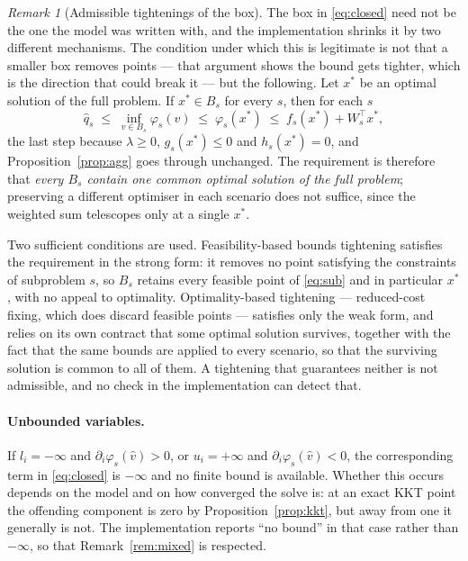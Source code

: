 \documentclass[11pt]{article}
\theoremstyle{plain}
\theoremstyle{remark}
\newtheorem{remark}[lemma]{Remark}
\newcommand{\W}{W}
\newcommand{\vhat}{\hat{v}}
\newcommand{\qhat}{\hat{q}}
\begin{document}
\begin{remark}[Admissible tightenings of the box]\label{rem:boxtighten}
The box in \eqref{eq:closed} need not be the one the model was written with, and
the implementation shrinks it by two different mechanisms.  The condition under
which this is legitimate is not that a smaller box removes points --- that
argument shows the bound gets tighter, which is the direction that could break
it --- but the following.  Let $x^{*}$ be an optimal solution of the full
problem.  If $x^{*} \in B_s$ for every $s$, then for each $s$
\[
  \qhat_s \;\le\; \inf_{v \in B_s} \varphi_s(v) \;\le\; \varphi_s(x^{*})
          \;\le\; f_s(x^{*}) + \W_s^{\top} x^{*},
\]
the last step because $\lambda \ge 0$, $g_s(x^{*}) \le 0$ and $h_s(x^{*}) = 0$,
and Proposition~\ref{prop:agg} goes through unchanged.  The requirement is
therefore that \emph{every $B_s$ contain one common optimal solution of the full
problem}; preserving a different optimiser in each scenario does not suffice,
since the weighted sum telescopes only at a single $x^{*}$.

Two sufficient conditions are used.  Feasibility-based bounds tightening
satisfies the requirement in the strong form: it removes no point satisfying the
constraints of subproblem $s$, so $B_s$ retains every feasible point of
\eqref{eq:sub} and in particular $x^{*}$, with no appeal to optimality.
Optimality-based tightening --- reduced-cost fixing, which does discard feasible
points --- satisfies only the weak form, and relies on its own contract that
some optimal solution survives, together with the fact that the same bounds are
applied to every scenario, so that the surviving solution is common to all of
them.  A tightening that guarantees neither is not admissible, and no check in
the implementation can detect that.
\end{remark}

\paragraph{Unbounded variables.}
If $l_i = -\infty$ and $\partial_i \varphi_s(\vhat) > 0$, or $u_i = +\infty$ and
$\partial_i \varphi_s(\vhat) < 0$, the corresponding term in \eqref{eq:closed} is
$-\infty$ and no finite bound is available.  Whether this occurs depends on the
model and on how converged the solve is: at an exact KKT point the offending
component is zero by Proposition~\ref{prop:kkt}, but away from one it generally
is not.  The implementation reports ``no bound'' in that case rather than
$-\infty$, so that Remark~\ref{rem:mixed} is respected.
\end{document}
